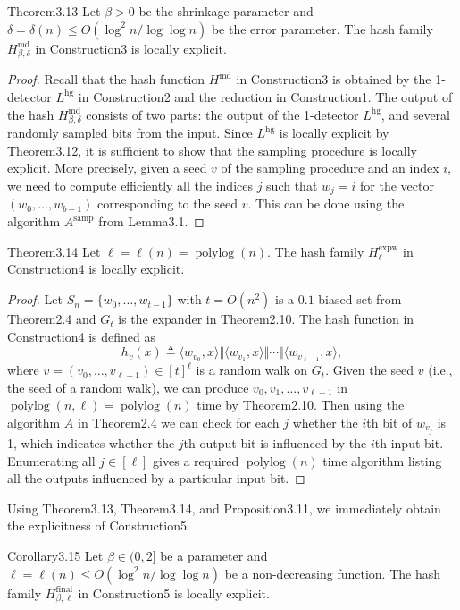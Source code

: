 \begin{authorclaim}{Theorem3.13}
Let $\beta>0$ be the shrinkage parameter and $\delta=\delta(n)\le O(\log^2n/\log\log n)$ be the error parameter. The hash family $H^{\mathrm{md}}_{\beta,\delta}$ in Construction3 is locally explicit.
\end{authorclaim}
\begin{proof}
Recall that the hash function $H^{\mathrm{md}}$ in Construction3 is obtained by the 1-detector $L^{\mathrm{hg}}$ in Construction2 and the reduction in Construction1. The output of the hash $H^{\mathrm{md}}_{\beta,\delta}$ consists of two parts: the output of the 1-detector $L^{\mathrm{hg}}$, and several randomly sampled bits from the input. Since $L^{\mathrm{hg}}$ is locally explicit by Theorem3.12, it is sufficient to show that the sampling procedure is locally explicit. More precisely, given a seed $v$ of the sampling procedure and an index $i$, we need to compute efficiently all the indices $j$ such that $w_j=i$ for the vector $(w_0,\ldots,w_{b-1})$ corresponding to the seed $v$. This can be done using the algorithm $A^{\mathrm{samp}}$ from Lemma3.1.
\end{proof}
\begin{authorclaim}{Theorem3.14}
Let $\ell=\ell(n)=\operatorname{polylog}(n)$. The hash family $H^{\mathrm{expw}}_\ell$ in Construction4 is locally explicit.
\end{authorclaim}
\begin{proof}
Let $S_n=\{w_0,\ldots,w_{t-1}\}$ with $t=\widetilde O(n^2)$ is a $0.1$-biased set from Theorem2.4 and $G_t$ is the expander in Theorem2.10. The hash function in Construction4 is defined as
\[h_v(x)\triangleq\langle w_{v_0},x\rangle\Vert\langle w_{v_1},x\rangle\Vert\cdots\Vert\langle w_{v_{\ell-1}},x\rangle,\]
where $v=(v_0,\ldots,v_{\ell-1})\in[t]^\ell$ is a random walk on $G_t$. Given the seed $v$ (i.e., the seed of a random walk), we can produce $v_0,v_1,\ldots,v_{\ell-1}$ in $\operatorname{polylog}(n,\ell)=\operatorname{polylog}(n)$ time by Theorem2.10. Then using the algorithm $A$ in Theorem2.4 we can check for each $j$ whether the $i$th bit of $w_{v_j}$ is 1, which indicates whether the $j$th output bit is influenced by the $i$th input bit. Enumerating all $j\in[\ell]$ gives a required $\operatorname{polylog}(n)$ time algorithm listing all the outputs influenced by a particular input bit.
\end{proof}
Using Theorem3.13, Theorem3.14, and Proposition3.11, we immediately obtain the explicitness of Construction5.
\begin{authorclaim}{Corollary3.15}
Let $\beta\in(0,2]$ be a parameter and $\ell=\ell(n)\le O(\log^2n/\log\log n)$ be a non-decreasing function. The hash family $H^{\mathrm{final}}_{\beta,\ell}$ in Construction5 is locally explicit.
\end{authorclaim}
